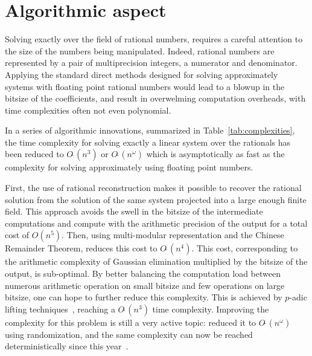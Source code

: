 \newcommand{\GO}[1]{\ensuremath{O(#1)}\xspace}
\newcommand{\SO}[1]{\ensuremath{O\tilde\ (#1)}\xspace}
\newcommand{\vect}[1]{\ensuremath{\mathbf{#1}}\xspace}
\newcommand{\mat}[1]{\ensuremath{\mathbf{#1}}\xspace}
\section{Algorithmic aspect}

Solving exactly over the field of rational numbers, requires a careful attention to the size of the numbers being
manipulated. Indeed, rational numbers are represented by a pair of multiprecision integers, a numerator and
denominator. Applying the standard direct methods designed for solving approximately systems with floating point
rational numbers would lead to a blowup in the bitsize of the coefficients, and result in overwelming computation
overheads, with time complexities often not even polynomial.


In a series of algorithmic innovations, summarized in Table~\ref{tab:complexities}, the time complexity for solving exactly a linear system over the rationals has
been reduced to $\SO{n^3}$ or $\SO{n^\omega}$ which is asymptotically as fast as the complexity for solving
approximately using floating point numbers.

First, the use of rational reconstruction makes it possible to recover the rational solution from the solution of the same
system projected into a large enough finite field.
This approach avoids the  swell in the bitsize of the intermediate computations and compute with the arithmetic precision of the output for a total cost of $\GO{n^5}$.
Then, using  multi-modular representation and the Chinese Remainder Theorem, reduces this cost  to $\SO{n^4}$.
This cost, corresponding to the arithmetic complexity of Gaussian elimination multiplied by the bitsize of the output,
is sub-optimal. By better balancing the computation load between numerous arithmetic operation on small bitsize and
few operations on large bitsize, one can hope to further reduce this complexity. This is achieved by $p$-adic lifting
techniques~\cite{Dix82}, reaching a $\SO{n^3}$ time complexity. Improving the complexity for this problem is still a
very active topic: \cite{Sto05} reduced it to $\SO{n^\omega}$ using randomization, and the same
complexity can now be reached deterministically since this year~\cite{BLS19}.



